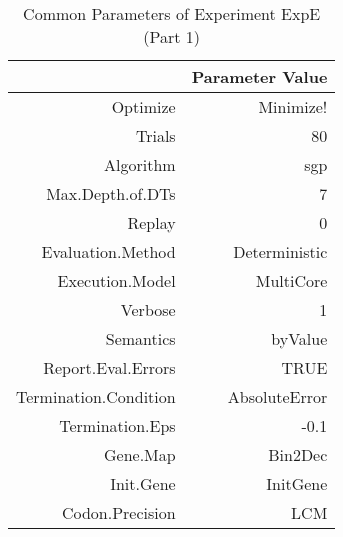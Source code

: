 \begin{table}[ht]
\centering
\begin{tabular}{rr}
  \hline
 & Parameter Value \\ 
  \hline
Optimize & Minimize! \\ 
  Trials & 80 \\ 
  Algorithm & sgp \\ 
  Max.Depth.of.DTs & 7 \\ 
  Replay & 0 \\ 
  Evaluation.Method & Deterministic \\ 
  Execution.Model & MultiCore \\ 
  Verbose & 1 \\ 
  Semantics & byValue \\ 
  Report.Eval.Errors & TRUE \\ 
  Termination.Condition & AbsoluteError \\ 
  Termination.Eps & -0.1 \\ 
  Gene.Map & Bin2Dec \\ 
  Init.Gene & InitGene \\ 
  Codon.Precision & LCM \\ 
   \hline
\end{tabular}
\caption{Common Parameters of Experiment ExpE (Part 1)} 
\end{table}
